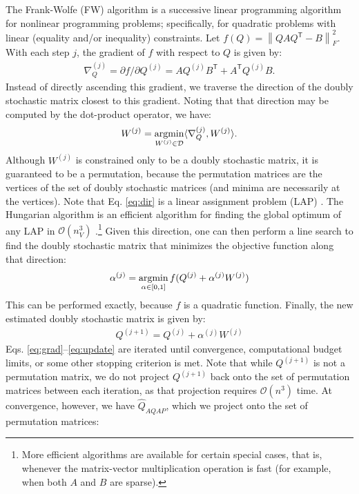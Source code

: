\documentclass{article} %
\providecommand{\norm}[1]{\left \lVert#1 \right  \rVert}
\newcommand{\argmin}{\operatornamewithlimits{argmin}}
\newcommand{\T}{^{\ensuremath{\mathsf{T}}}}           %
\providecommand{\mc}[1]{\mathcal{#1}}
\providecommand{\mh}[1]{\hat{#1}}
\begin{document}
The Frank-Wolfe (FW) algorithm is a successive linear programming algorithm for nonlinear programming problems; specifically, for quadratic problems with linear (equality and/or inequality) constraints. Let $f(Q)=\norm{QAQ\T-B}_F^2$.  With each step $j$, the gradient of $f$ with respect to $Q$ is given by:
\begin{align} \label{eq:grad}
	\nabla_Q^{(j)} = \partial f / \partial Q^{(j)} =  A Q^{(j)} B\T + A\T Q^{(j)} B.
\end{align}
Instead of directly ascending this gradient, we traverse the direction of the doubly stochastic matrix closest to this gradient. Noting that that direction may be computed by the dot-product operator, we have:
\begin{align}\label{eq:dir}
	W^{(j)} = \argmin_{W^{(j)} \in \mc{D}} \langle \nabla_Q^{(j)},W^{(j)} \rangle. %
\end{align}
Although $W^{(j)}$ is constrained only to be a doubly stochastic matrix, it is guaranteed to be a permutation, because the permutation matrices are the vertices of the set of doubly stochastic matrices (and minima are necessarily at the vertices).  Note that Eq. \eqref{eq:dir} is a linear assignment problem (LAP) \cite{Burkard2009}.  The Hungarian algorithm is an efficient algorithm for finding the global optimum of any LAP in $\mc{O}(n_V^3)$ \cite{Burkard2009}.\footnote{More efficient algorithms are available for certain special cases, that is, whenever the matrix-vector multiplication operation is fast (for example, when both $A$ and $B$ are sparse).} Given this direction, one can then perform a line search to find the doubly stochastic matrix that minimizes the objective function along that direction:
\begin{align}
	\alpha^{(j)} = \argmin_{\alpha \in [0,1]} f(Q^{(j)} + \alpha^{(j)} W^{(j)})
\end{align}
This can be performed exactly, because $f$ is a quadratic function.  Finally, the new estimated doubly stochastic matrix is given by:
\begin{align}\label{eq:update}
	Q^{(j+1)} = Q^{(j)} + \alpha^{(j)} W^{(j)}
\end{align}
Eqs. \eqref{eq:grad}--\eqref{eq:update} are iterated until convergence, computational budget limits, or some other stopping criterion is met.  Note that while $Q^{(j+1)}$ is not a permutation matrix, we do not project $Q^{(j+1)}$ back onto the set of permutation matrices between each iteration, as that projection requires $\mc{O}(n^3)$ time. At convergence, however, we have $\mh{Q}_{AQAP}$, which we project onto the set of permutation matrices:
\end{document}
